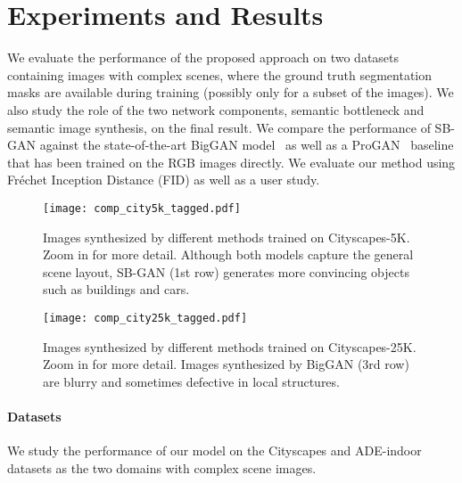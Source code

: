 \documentclass[10pt,twocolumn,letterpaper]{article}
\begin{document}
\section{Experiments and Results}
We evaluate the performance of the proposed approach on two datasets containing images with complex scenes, where the ground truth segmentation masks are available during training (possibly only for a subset of the images). We also study the role of the two network components, semantic bottleneck and semantic image synthesis, on the final result. We compare the performance of SB-GAN against the state-of-the-art BigGAN model~\cite{biggan} as well as a ProGAN~\cite{PGGAN} baseline that has been trained on the RGB images directly. We evaluate our method using Fr\'echet Inception Distance (FID) as well as a user study.

\begin{figure*}[t!]
\centering
\texttt{[image: comp\_city5k\_tagged.pdf]}
\caption{Images synthesized by different methods trained on Cityscapes-5K. Zoom in for more detail. Although both models capture the general scene layout, SB-GAN (1st row) generates more convincing objects such as buildings and cars.}
\label{fig:city5k}
\end{figure*}

\begin{figure*}
\centering
\texttt{[image: comp\_city25k\_tagged.pdf]}
\caption{Images synthesized by different methods trained on Cityscapes-25K. Zoom in for more detail. Images synthesized by BigGAN (3rd row) are blurry and sometimes defective in local structures.}
\label{fig:city25k}
\end{figure*}

\vspace{-2mm}
\paragraph{Datasets} We study the performance of our model on the Cityscapes and ADE-indoor datasets as the two domains with complex scene images.
\end{document}
